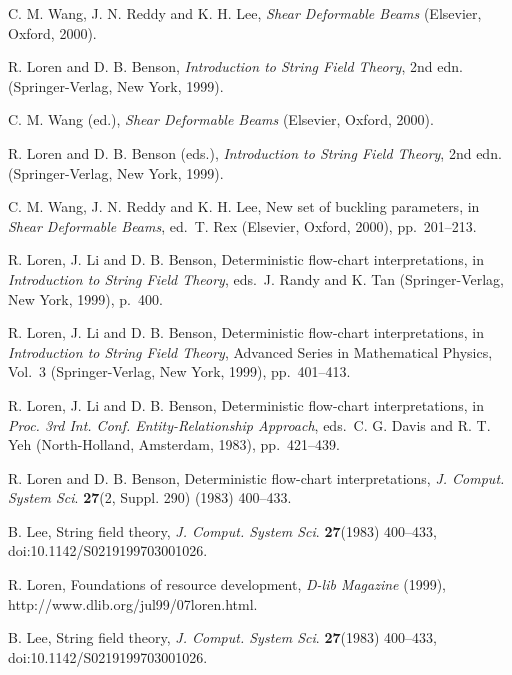 \documentclass{ws-ijait}
\begin{document}
\begin{thebibliography}{00}
 C. M. Wang, J. N. Reddy and K. H. Lee, {\it Shear Deformable
Beams} (Elsevier, Oxford, 2000).

 R. Loren and D. B. Benson, {\it Introduction to String Field
Theory}, 2nd edn. (Springer-Verlag, New York, 1999).

 C. M. Wang (ed.), {\it Shear Deformable Beams}
(Elsevier, Oxford, 2000).

 R. Loren and D. B. Benson (eds.), {\it Introduction to
String Field Theory}, 2nd edn. (Springer-Verlag, New York, 1999).

 C. M. Wang, J. N. Reddy and K. H. Lee, New set of buckling
parameters, in {\it Shear Deformable Beams}, ed.~T. Rex
(Elsevier, Oxford, 2000), pp.~201--213.

 R. Loren, J. Li and D. B. Benson, Deterministic flow-chart
interpretations, in {\it Introduction to String Field Theory},
eds.~J. Randy and K. Tan (Springer-Verlag, New York, 1999), p.~400.

 R. Loren, J. Li and D. B. Benson, Deterministic
flow-chart interpretations, in {\it Introduction to String Field Theory},
Advanced Series in Mathematical Physics, Vol.~3
(Springer-Verlag, New York, 1999), pp.~401--413.

 R. Loren, J. Li and D. B. Benson, Deterministic flow-chart
interpretations, in {\it Proc. 3rd Int. Conf. Entity-Relationship
Approach}, eds.~C. G. Davis and R. T. Yeh (North-Holland, Amsterdam, 1983),
pp.~421--439.

 R. Loren and D. B. Benson, Deterministic flow-chart
interpretations, {\it J. Comput. System Sci}. {\bf 27}(2, Suppl. 290)
(1983) 400--433.

 B. Lee, String field theory, {\it J. Comput. System Sci}.
{\bf 27}(1983) 400--433, doi:10.1142/S0219199703001026.

 R. Loren, Foundations of resource development,
{\it D-lib Magazine} (1999), http://www.dlib.org/jul99/07loren.html.

 B. Lee, String field theory, {\it J. Comput. System Sci}.
{\bf 27}(1983) 400--433, doi:10.1142/S0219199703001026.

\end{thebibliography}
\end{document}
